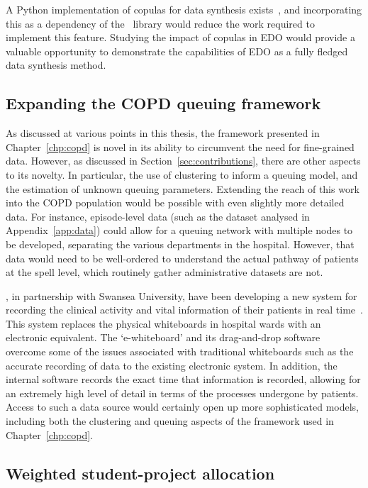 A Python implementation of copulas for data synthesis exists~\cite{copulas}, and
incorporating this as a dependency of the \edo\ library would reduce the work
required to implement this feature. Studying the impact of copulas in EDO would
provide a valuable opportunity to demonstrate the capabilities of EDO as a fully
fledged data synthesis method.

\subsection*{Expanding the COPD queuing framework}

As discussed at various points in this thesis, the framework presented in
Chapter~\ref{chp:copd} is novel in its ability to circumvent the need for
fine-grained data. However, as discussed in Section~\ref{sec:contributions},
there are other aspects to its novelty. In particular, the use of clustering to
inform a queuing model, and the estimation of unknown queuing parameters.
Extending the reach of this work into the COPD population would be possible with
even slightly more detailed data. For instance, episode-level data (such as the
dataset analysed in Appendix~\ref{app:data}) could allow for a queuing network
with multiple nodes to be developed, separating the various departments in the
hospital. However, that data would need to be well-ordered to understand the
actual pathway of patients at the spell level, which routinely gather
administrative datasets are not.

\ctmuhb, in partnership with Swansea University, have been developing a new
system for recording the clinical activity and vital information of their
patients in real time~\cite{whiteboards}. This system replaces the physical
whiteboards in hospital wards with an electronic equivalent. The `e-whiteboard'
and its drag-and-drop software overcome some of the issues associated with
traditional whiteboards such as the accurate recording of data to the existing
electronic system. In addition, the internal software records the exact time
that information is recorded, allowing for an extremely high level of detail in
terms of the processes undergone by patients. Access to such a data source would
certainly open up more sophisticated models, including both the clustering and
queuing aspects of the framework used in Chapter~\ref{chp:copd}.

\subsection*{Weighted student-project allocation}

